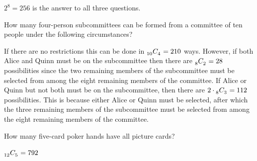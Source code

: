 \documentclass[12pt]{exam}
\newcommand\ncr[2]{\tensor[_{#1}]C{_{#2}}}
\begin{document}
\begin{questions}
\begin{solution} $2^8=256$ is the answer to all three questions.\end{solution}

\question How many four-person subcommittees can be formed
from a committee of ten people under the following circumstances?
\begin{solution}
If there are no restrictions this can
be done in $\ncr{10}{4}=210$ ways.
However, if both Alice and Quinn must be on the subcommittee
then there are $\ncr{8}{2}=28$ possibilities since the two remaining
members of the subcommittee
must be selected from among the eight remaining members of the committee.
If Alice or Quinn but not both must be on the subcommittee,
then there are $2\cdot\ncr{8}{3}=112$ possibilities.
This is because either Alice or Quinn must be selected,
after which the three remaining members of the subcommittee
must be selected from among the eight remaining members of the committee.
\end{solution}

\question How many five-card poker hands have all picture cards?
\begin{solution}$\ncr{12}{5}=792$\end{solution}


\end{questions}
\end{document}
